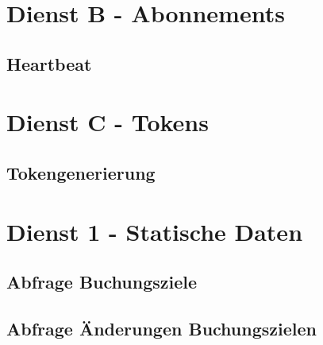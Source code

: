 \section{Dienst B - Abonnements}
\label{sec:Nachrichten:DienstB}

\subsection*{Heartbeat}
\label{subsec:Nachrichten:DienstB:HeartBeat}





\section{Dienst C - Tokens}
\label{sec:Nachrichten:DienstC}

\subsection*{Tokengenerierung}
\label{subsec:Nachrichten:DienstC:Tokengenerierung}





\section{Dienst 1 - Statische Daten}
\label{sec:Nachrichten:Dienst1}

\subsection*{Abfrage Buchungsziele}
\label{subsec:Nachrichten:Dienst1:BookingTargets}





\subsection*{Abfrage Änderungen Buchungszielen}
\label{subsec:Nachrichten:Dienst1:ChangeProviders}





